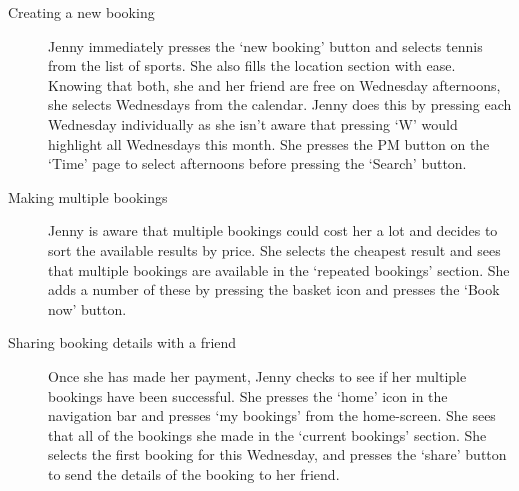 \begin{description}
	\item[Creating a new booking] Jenny immediately presses the `new booking'
		button and selects tennis from the list of sports. She also fills the
		location section with ease. Knowing that both, she and her friend are
		free on Wednesday afternoons, she selects Wednesdays from the calendar.
		Jenny does this by pressing each Wednesday individually as she isn't
		aware that pressing `W' would highlight all Wednesdays this month. She
		presses the PM button on the `Time' page to select afternoons before
		pressing the `Search' button.

	\item[Making multiple bookings] Jenny is aware that multiple bookings could
		cost her a lot and decides to sort the available results by price. She
		selects the cheapest result and sees that multiple bookings are
		available in the `repeated bookings' section. She adds a number of
		these by pressing the basket icon and presses the `Book now' button.

	\item[Sharing booking details with a friend] Once she has made her payment,
		Jenny checks to see if her multiple bookings have been successful. She
		presses the `home' icon in the navigation bar and presses `my bookings'
		from the home-screen. She sees that all of the bookings she made in the
		`current bookings' section.  She selects the first booking for this
		Wednesday, and presses the `share' button to send the details of the
		booking to her friend.
\end{description}

